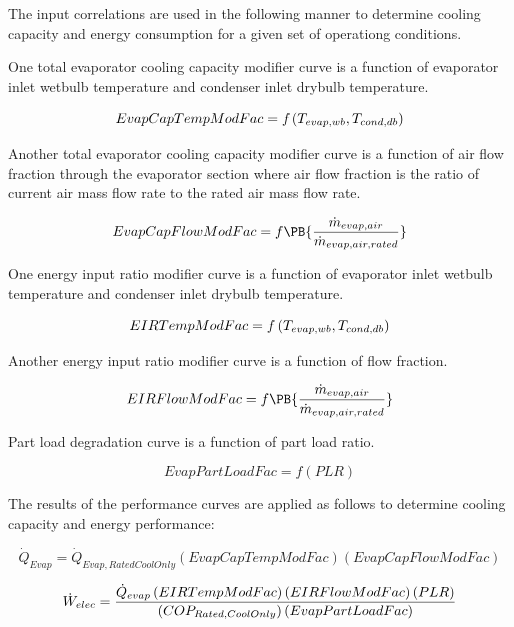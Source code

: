 The input correlations are used in the following manner to determine cooling capacity and energy consumption for a given set of operationg conditions.

One total evaporator cooling capacity modifier curve is a function of evaporator inlet wetbulb temperature and condenser inlet drybulb temperature.

\begin{equation}
EvapCapTempModFac = {f_{}}\left( {{T_{evap,wb}},{\rm{}}{T_{cond,db}}} \right)
\end{equation}

Another total evaporator cooling capacity modifier curve is a function of air flow fraction through the evaporator section where air flow fraction is the ratio of current air mass flow rate to the rated air mass flow rate.

\begin{equation}
  EvapCapFlowModFac = f\PB{\frac{\dot{m}_{evap,air}}{\dot{m}_{evap,air,rated}}}
\end{equation}

One energy input ratio modifier curve is a function of evaporator inlet wetbulb temperature and condenser inlet drybulb temperature.

\begin{equation}
EIRTempModFac = f\left( {{T_{evap,wb}},{\rm{}}{T_{cond,db}}} \right)
\end{equation}

Another energy input ratio modifier curve is a function of flow fraction.

\begin{equation}
  EIRFlowModFac = f\PB{\frac{\dot{m}_{evap,air}}{\dot{m}_{evap,air,rated}}}
\end{equation}

Part load degradation curve is a function of part load ratio.

\begin{equation}
EvapPartLoadFac = f\left( {PLR} \right)
\end{equation}

The results of the performance curves are applied as follows to determine cooling capacity and energy performance:

\begin{equation}
{\dot Q_{Evap}} = {\dot Q_{Evap,RatedCoolOnly}}\left( {EvapCapTempModFac} \right)\left( {EvapCapFlowModFac} \right)
\end{equation}

\begin{equation}
{\dot W_{elec}} = \frac{{{{\dot Q}_{evap}}\left( {EIRTempModFac} \right)\left( {EIRFlowModFac} \right)\left( {PLR} \right)}}{{\left( {CO{P_{Rated,{\rm{}}CoolOnly}}} \right)\left( {EvapPartLoadFac} \right)}}
\end{equation}

